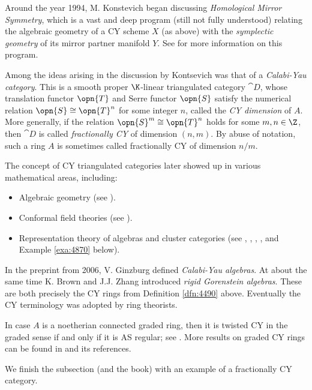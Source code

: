 \begin{rem}
Around the year 1994, M. Konstevich began discussing {\em Homological Mirror 
Symmetry}, which is a vast and deep program (still not fully understood) 
relating the algebraic geometry of a CY scheme $X$ (as above) with the {\em 
symplectic geometry} of its mirror partner manifold $Y$.  See \cite{HMS}
for more information on this program. 

Among the ideas arising in the discussion 
by Kontsevich was that of a {\em Calabi-Yau category}. This is a smooth 
proper $\K$-linear triangulated category $\cat{D}$, whose translation functor 
$\opn{T}$ and Serre functor $\opn{S}$ satisfy the numerical relation 
$\opn{S} \cong \opn{T}^n$ for some integer $n$, called the {\em CY dimension} 
of $A$. More generally, if the relation $\opn{S}^m \cong \opn{T}^n$ holds for 
some $m, n \in \Z$, then $\cat{D}$ is called  {\em fractionally CY}
of dimension $(n, m)$. By abuse of notation, such a ring $A$ is sometimes 
called fractionally CY of dimension $n / m$. 

The concept of CY triangulated categories later showed up in various 
mathematical areas, including:
\begin{itemize}
\item Algebraic geometry (see \cite{Kuz}). 

\item Conformal field theories (see \cite{Cost}).

\item Representation theory of algebras and cluster categories
(see  \cite{CCS}, \cite{BMRRT}, \cite{Kel4}, \cite{Kel2}, \cite{Lad} and 
Example \ref{exa:4870} below).
\end{itemize}

In the preprint \cite{Ginz} from 2006, V. Ginzburg defined {\em Calabi-Yau 
algebras}. At about the same time K. Brown and J.J. Zhang \cite{BrZh} 
introduced {\em rigid Gorenstein algebras}. These are both precisely 
the CY rings from Definition \ref{dfn:4490} above.
Eventually the CY terminology was adopted by ring theorists. 

In case $A$ is a noetherian connected graded ring, then it is twisted CY in the 
graded sense if and only if it is AS regular; see \cite{ReRoZh}.
More results on graded CY rings can be found in \cite{ReRo} and its references.
\end{rem}

We finish the subsection (and the book) with an example of a fractionally CY 
category. 

